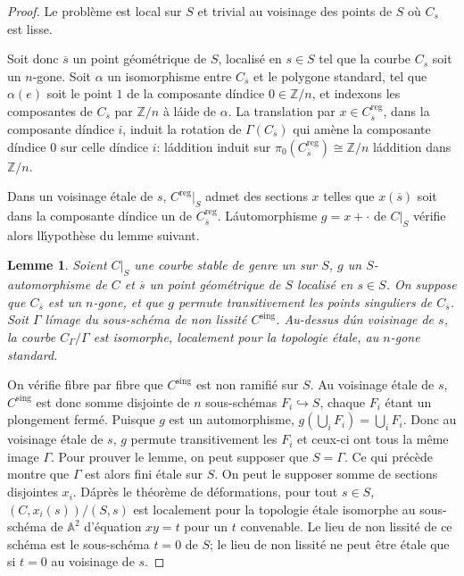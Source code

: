 \documentclass{amsart}
\theoremstyle{plain}
\newtheorem{lemma}[theorem]{Lemme}
\theoremstyle{remark}
\newcommand{\bbA}{\mathbb{A}}
\newcommand{\bbZ}{\mathbb{Z}}
\begin{document}
\begin{proof}
Le probl\`eme est local sur $S$ et trivial au voisinage des points de $S$ o\`u $C_s$
est lisse.

Soit donc $\overline{s}$ un point g\'eom\'etrique de $S$, localis\'e en $s \in S$ tel que la
courbe $C_s$ soit un $n$-gone. Soit $\alpha$ un isomorphisme entre $C_{\overline{s}}$ et le
polygone standard, tel que $\alpha(e)$ soit le point $1$ de la composante d\'indice
$0 \in \bbZ/n$, et indexons les composantes de $C_{\overline{s}}$ par $\bbZ/n$ \`a l\'aide de
$\alpha$. La translation par $x \in C_{\overline{s}}^{\mathrm{reg}}$, dans la composante d\'indice $i$,
induit la rotation de $\Gamma(C_{\overline{s}})$ qui am\`ene la composante d\'indice $0$ sur
celle d\'indice $i$: l\'addition induit sur $\pi_0(C_{\overline{s}}^{\mathrm{reg}}) \cong \bbZ/n$
l\'addition dans $\bbZ/n$.

Dans un voisinage \'etale de $s$, $C^{\mathrm{reg}}|_S$ admet des sections $x$ telles que
$x(\overline{s})$ soit dans la composante d\'indice un de $C_{\overline{s}}^{\mathrm{reg}}$.
L\'automorphisme $g = x + \cdot$ de $C|_S$ v\'erifie alors l\'hypoth\`ese du lemme
suivant.

\begin{lemma}
Soient $C|_S$ une courbe stable de genre un sur $S$, $g$ un $S$-automorphisme de $C$
et $\overline{s}$ un point g\'eom\'etrique de $S$ localis\'e en $s \in S$. On suppose que
$C_{\overline{s}}$ est un $n$-gone, et que $g$ permute transitivement les points singuliers de
$C_{\overline{s}}$. Soit $\Gamma$ l\'image du sous-sch\'ema de non lissit\'e $C^{\mathrm{sing}}$.
Au-dessus d\'un voisinage de $s$, la courbe $C_\Gamma/\Gamma$ est isomorphe, localement
pour la topologie \'etale, au $n$-gone standard.
\end{lemma}

On v\'erifie fibre par fibre que $C^{\mathrm{sing}}$ est non ramifi\'e sur $S$. Au voisinage
\'etale de $s$, $C^{\mathrm{sing}}$ est donc somme disjointe de $n$ sous-sch\'emas
$F_i \hookrightarrow S$, chaque $F_i$ \'etant un plongement ferm\'e. Puisque $g$ est un
automorphisme, $g(\bigcup_i F_i) = \bigcup_i F_i$. Donc au voisinage \'etale de $s$,
$g$ permute transitivement les $F_i$ et ceux-ci ont tous la m\^eme image $\Gamma$.
Pour prouver le lemme, on peut supposer que $S = \Gamma$. Ce qui pr\'ec\`ede montre que
$\Gamma$ est alors fini \'etale sur $S$. On peut le supposer somme de sections
disjointes $x_i$. D\'apr\`es le th\'eor\`eme de d\'eformations, pour tout $s \in S$,
$(C, x_i(s))/(S,s)$ est localement pour la topologie \'etale isomorphe au
sous-sch\'ema de $\bbA^2$ d'\'equation $xy = t$ pour un $t$ convenable. Le lieu de non
lissit\'e de ce sch\'ema est le sous-sch\'ema $t = 0$ de $S$; le lieu de non lissit\'e ne
peut \^etre \'etale que si $t = 0$ au voisinage de $s$.


\end{proof}
\end{document}
